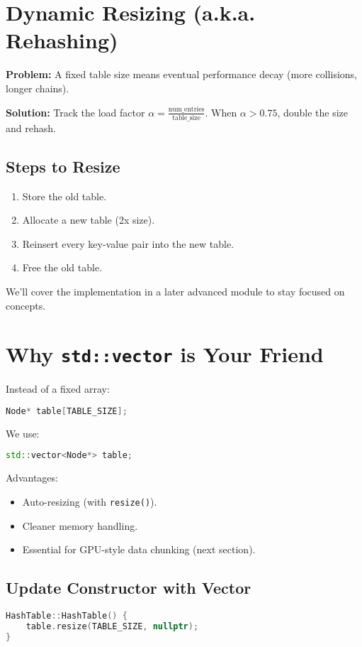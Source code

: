 \documentclass{article}
\begin{document}
\section*{Dynamic Resizing (a.k.a. Rehashing)}

\textbf{Problem:} A fixed table size means eventual performance decay (more collisions, longer chains).

\textbf{Solution:} Track the load factor \( \alpha = \frac{\text{num\_entries}}{\text{table\_size}} \). When \( \alpha > 0.75 \), double the size and rehash.

\subsection*{Steps to Resize}
\begin{enumerate}
    \item Store the old table.
    \item Allocate a new table (2x size).
    \item Reinsert every key-value pair into the new table.
    \item Free the old table.
\end{enumerate}

We’ll cover the implementation in a later advanced module to stay focused on concepts.

\section*{Why \texttt{std::vector} is Your Friend}

Instead of a fixed array:

\begin{lstlisting}[language=C++]
Node* table[TABLE_SIZE];
\end{lstlisting}

We use:

\begin{lstlisting}[language=C++]
std::vector<Node*> table;
\end{lstlisting}

Advantages:
\begin{itemize}
    \item Auto-resizing (with \texttt{resize()}).
    \item Cleaner memory handling.
    \item Essential for GPU-style data chunking (next section).
\end{itemize}

\subsection*{Update Constructor with Vector}
\begin{lstlisting}[language=C++]
HashTable::HashTable() {
    table.resize(TABLE_SIZE, nullptr);
}
\end{lstlisting}
\end{document}
